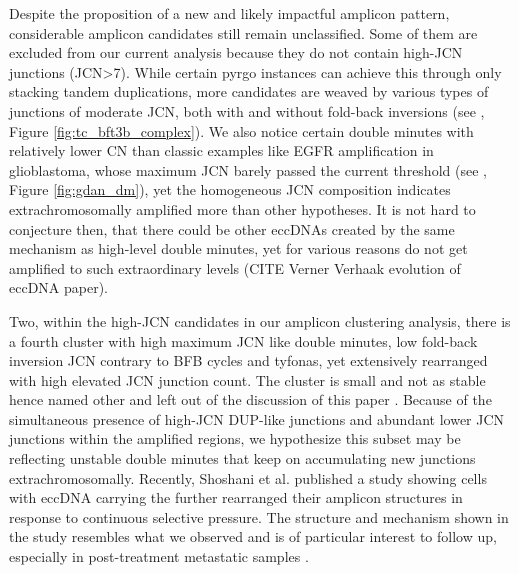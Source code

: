 \documentclass[phd,tocprelim]{cornell}
\begin{document}
Despite the proposition of a new and likely impactful amplicon pattern, considerable amplicon candidates still remain unclassified. Some of them are excluded from our current analysis because they do not contain high-JCN junctions (JCN>7). While certain pyrgo instances can achieve this through only stacking tandem duplications, more candidates are weaved by various types of junctions of moderate JCN, both with and without fold-back inversions (see , Figure \ref{fig:tc_bft3b_complex}). We also notice certain double minutes with relatively lower CN than classic examples like EGFR amplification in glioblastoma, whose maximum JCN barely passed the current threshold (see , Figure \ref{fig:gdan_dm}), yet the homogeneous JCN composition indicates extrachromosomally amplified more than other hypotheses. It is not hard to conjecture then, that there could be other eccDNAs created by the same mechanism as high-level double minutes, yet for various reasons do not get amplified to such extraordinary levels (CITE Verner Verhaak evolution of eccDNA paper).

Two, within the high-JCN candidates in our amplicon clustering analysis, there is a fourth cluster with high maximum JCN like double minutes, low fold-back inversion JCN contrary to BFB cycles and tyfonas, yet extensively rearranged with high elevated JCN junction count. The cluster is small and not as stable hence named other and left out of the discussion of this paper \cite{Hadi2020-um}. Because of the simultaneous presence of high-JCN DUP-like junctions and abundant lower JCN junctions within the amplified regions, we hypothesize this subset may be reflecting unstable double minutes that keep on accumulating new junctions extrachromosomally. Recently, Shoshani et al. published a study showing cells with eccDNA carrying the  further rearranged their amplicon structures in response to continuous selective pressure. The structure and mechanism shown in the study resembles what we observed and is of particular interest to follow up, especially in post-treatment metastatic samples \cite{Priestley:20196a6}.



\end{document}
